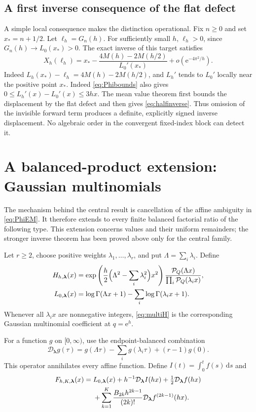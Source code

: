 \documentclass[11pt,a4paper]{article}
\numberwithin{equation}{section}
\theoremstyle{definition}
\newcommand{\ee}{\mathrm e}
\newcommand{\dd}{\,\mathrm d}
\newcommand{\Pq}{\mathcal P}
\begin{document}
\subsection{A first inverse consequence of the flat defect}
A simple local consequence makes the distinction operational. Fix $n\ge0$ and set $x_*=n+1/2$. Let $\ell_h=G_n(h)$. For sufficiently small $h$, $\ell_h>0$, since $G_n(h)\to L_0(x_*)>0$. The exact inverse of this target satisfies
\begin{equation}
X_h(\ell_h)=x_*
 -\frac{4M(h)-2M(h/2)}{L_0'(x_*)}
 +o(\ee^{-4\pi^2/h}).
\label{eq:halfinverse}
\end{equation}
Indeed $L_h(x_*)-\ell_h=4M(h)-2M(h/2)$, and $L_h'$ tends to $L_0'$ locally near the positive point $x_*$. Indeed \eqref{eq:Phibounds} also gives $0\le L_h'(x)-L_0'(x)\le3hx$. The mean value theorem first bounds the displacement by the flat defect and then gives \eqref{eq:halfinverse}. Thus omission of the invisible forward term produces a definite, explicitly signed inverse displacement. No algebraic order in the convergent fixed-index block can detect it.

\section{A balanced-product extension: Gaussian multinomials}
\label{sec:multinomial}

The mechanism behind the central result is cancellation of the affine ambiguity in \eqref{eq:PhiEM}. It therefore extends to every finite balanced factorial ratio of the following type. This extension concerns values and their uniform remainders; the stronger inverse theorem has been proved above only for the central family.

Let $r\ge2$, choose positive weights $\lambda_1,\ldots,\lambda_r$, and put $\Lambda=\sum_i\lambda_i$. Define
\begin{align}
H_{h,\boldsymbol\lambda}(x)
 &=\exp\left(\frac h2\Bigl(\Lambda^2-\sum_i\lambda_i^2\Bigr)x^2\right)
       \frac{\Pq_Q(\Lambda x)}{\prod_i\Pq_Q(\lambda_i x)},\label{eq:multiH}\\
L_{0,\boldsymbol\lambda}(x)
 &=\log\Gamma(\Lambda x+1)-\sum_i\log\Gamma(\lambda_i x+1).
\label{eq:multicore}
\end{align}
Whenever all $\lambda_i x$ are nonnegative integers, \eqref{eq:multiH} is the corresponding Gaussian multinomial coefficient at $q=\ee^h$.

For a function $g$ on $[0,\infty)$, use the endpoint-balanced combination
\begin{equation}
\mathcal D_{\boldsymbol\lambda}g(\tau)
 =g(\Lambda\tau)-\sum_i g(\lambda_i\tau)+(r-1)g(0).
\label{eq:Dmulti}
\end{equation}
This operator annihilates every affine function. Define $I(t)=\int_0^t f(s)\dd s$ and
\begin{align}
F_{h,K,\boldsymbol\lambda}(x)
={}&L_{0,\boldsymbol\lambda}(x)
 +h^{-1}\mathcal D_{\boldsymbol\lambda}I(hx)
 +\tfrac12\mathcal D_{\boldsymbol\lambda}f(hx)\notag\\
&+\sum_{k=1}^K\frac{B_{2k}h^{2k-1}}{(2k)!}
             \mathcal D_{\boldsymbol\lambda}f^{(2k-1)}(hx).
\label{eq:multiF}
\end{align}
\end{document}
